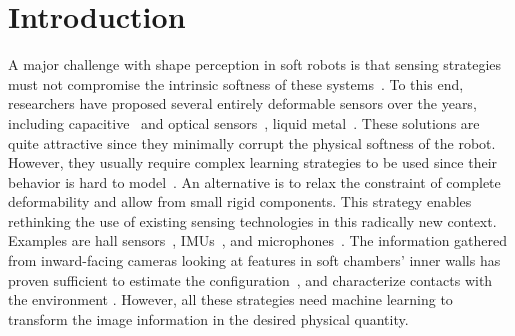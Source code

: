\section{Introduction}\label{sec:srslam:introduction}
%
A major challenge with shape perception in soft robots is that sensing strategies must not compromise the intrinsic softness of these systems~\cite{polygerinos2017soft,wang2018toward}. %
%
To this end, researchers have proposed several entirely deformable sensors over the years, including capacitive~\cite{scimeca2019model} and optical sensors~\cite{li2021scaling}, liquid metal~\cite{wall2017method}. These solutions are quite attractive since they minimally corrupt the physical softness of the robot. However, they usually require complex learning strategies to be used since their behavior is hard to model~\cite{thuruthel2019soft,truby2020distributed}.
%
% 
An alternative is to relax the constraint of complete deformability and allow from small rigid components. This strategy enables rethinking the use of existing sensing technologies in this radically new context. Examples are hall sensors~\cite{guo2019continuum}, IMUs~\cite{hughes2020sensing}, and microphones~\cite{zoller2018acoustic}. %
%
The information gathered from inward-facing cameras looking at features in soft chambers' inner walls has proven sufficient to estimate the configuration~\cite{she2020exoskeleton,werner2020vision}, and characterize contacts with the environment \cite{ward2018tactip,lin2020curvature}. However, all these strategies need machine learning to transform the image information in the desired physical quantity.
%
